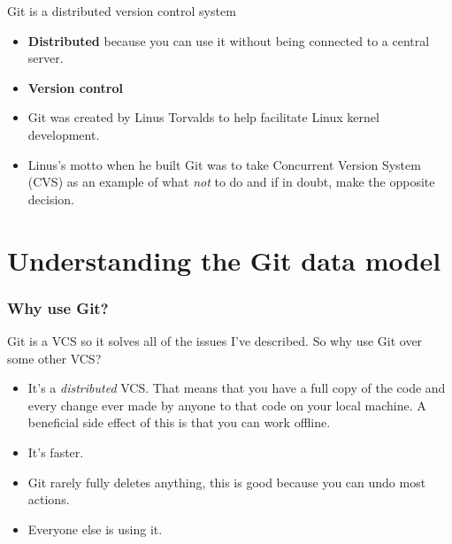 \documentclass{beeper}
\begin{document}
\begin{frame}{Git is a distributed version control system}
    \begin{itemize}[<+->]
        \item \textbf{Distributed} because you can use it without being
            connected to a central server.
        \item \textbf{Version control} 
        \item Git was created by Linus Torvalds to help facilitate Linux kernel
            development.
        \item Linus's motto when he built Git was to take Concurrent Version
            System (CVS) as an example of what \textit{not} to do and if in
            doubt, make the opposite decision.  \footnotemark
    \end{itemize}

\end{frame}

\section{Understanding the Git data model}

\begin{frame}
    \frametitle{Why use Git?}

    Git is a VCS so it solves all of the issues I've described. So why use Git
    over some other VCS?\footnotemark

    \begin{itemize}[<+->]
        \item It's a \textit{distributed} VCS. That means that you have a full
            copy of the code and every change ever made by anyone to that code
            on your local machine. A beneficial side effect of this is that you
            can work offline.
        \item It's faster.
        \item Git rarely fully deletes anything, this is good because you can
            undo most actions.
        \item Everyone else is using it.
    \end{itemize}

\end{frame}
\end{document}
